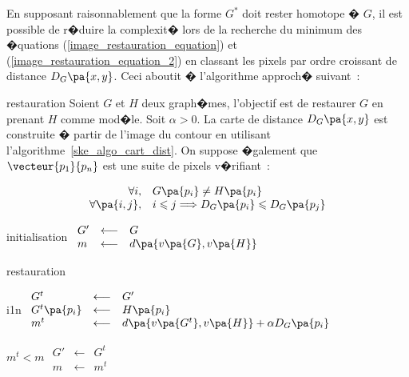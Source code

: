 
En supposant raisonnablement que la forme $G^*$ doit rester homotope � $G$, il est possible de r�duire la complexit� lors de la recherche du minimum des �quations (\ref{image_restauration_equation}) et (\ref{image_restauration_equation_2}) en classant les pixels par ordre croissant de distance $D_G\pa{x,y}$. Ceci aboutit � l'algorithme approch� suivant~:

            \begin{xalgorithm}{restauration}
            Soient $G$ et $H$ deux graph�mes, l'objectif est de restaurer $G$ en prenant $H$ comme mod�le. 
            Soit $\alpha > 0$.
            La carte de distance $D_G\pa{x,y}$ est construite � partir de l'image du contour en utilisant
            l'algorithme~\ref{ske_algo_cart_dist}. On suppose �galement que $\vecteur{p_1}{p_n}$ est une suite 
            de pixels v�rifiant~:
            
                    $$
                    \begin{array}{rl}
                    \forall i,                 & G\pa{p_i} \neq H\pa{p_i} \\
                    \forall \pa{i,j}, &  i \leqslant j \Longrightarrow D_G\pa{p_i} \leqslant D_G\pa{p_j}
                    \end{array}
                    $$
            
            
            \begin{xalgostep}{initialisation}
            $\begin{array}{lll}
            G' &\longleftarrow& G \\
            m  &\longleftarrow& d\pa{v\pa{G},v\pa{H}}
            \end{array}$
            \end{xalgostep}
            
            \begin{xalgostep}{restauration}
            \begin{xfor}{i}{1}{n}
            $\begin{array}{lll}
            G^t                 &\longleftarrow& G' \\
            G^t\pa{p_i} &\longleftarrow& H\pa{p_i} \\
            m^t                    &\longleftarrow& d\pa{v\pa{G^t},v\pa{H}} + \alpha D_G\pa{p_i}
            \end{array}$ \\
            \begin{xif}{$m^t < m$}
            $\begin{array}{lll}
            G' &\longleftarrow& G^t \\
            m  &\longleftarrow& m^t
            \end{array}$
            \end{xif}
            \end{xfor}
            \end{xalgostep}
            
            \end{xalgorithm}
        

